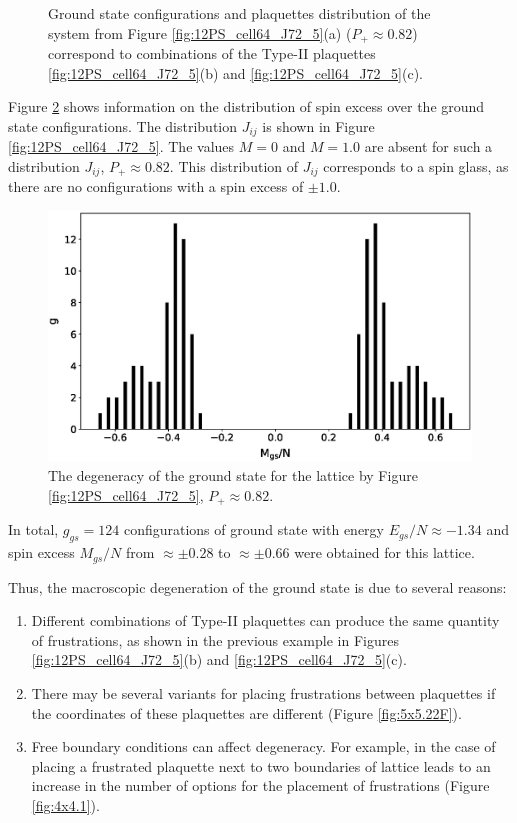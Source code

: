 \documentclass[preprint,12pt]{elsarticle}
\begin{document}
\begin{figure}[H]
\begin{minipage}[h]{0.3\linewidth}
		\end{minipage}
		\caption{Ground state configurations  and plaquettes distribution of the system from Figure \ref{fig:12PS_cell64_J72_5}(a) ($P_+\approx0.82$) correspond to combinations of the Type-II plaquettes \ref{fig:12PS_cell64_J72_5}(b) and \ref{fig:12PS_cell64_J72_5}(c).}
		\label{fig:12F_cell64_J72_5}
	\end{figure}
	
	Figure \ref{fig:g_Mgs} shows information on the distribution of spin excess over the ground state configurations. The distribution $J_{ij}$ is shown in Figure \ref{fig:12PS_cell64_J72_5}. The values $M=0$ and $M=1.0$ are absent for such a distribution $J_{ij}$, $P_+\approx0.82$. This distribution of $J_{ij}$ corresponds to a spin glass, as there are no configurations with a spin excess of $\pm1.0$.
	
	\begin{figure}[H]
		\centering
		\includegraphics[width=0.8\linewidth]{pictures/g_Mgs.eps}
		\caption{The degeneracy of the ground state for the lattice by Figure \ref{fig:12PS_cell64_J72_5}, $P_+\approx0.82$.}
		\label{fig:g_Mgs}
	\end{figure}
	
	In total, $g_{gs}=124$ configurations of ground state with energy $E_{gs}/N \approx -1.34$ and spin excess $M_{gs}/N$ from $\approx \pm 0.28$ to $\approx \pm 0.66$ were obtained for this lattice. 
	
	Thus, the macroscopic degeneration of the ground state is due to several reasons:
	
	\begin{enumerate}
		\item Different combinations of Type-II plaquettes can produce the same quantity of frustrations, as shown in the previous example in Figures \ref{fig:12PS_cell64_J72_5}(b) and \ref{fig:12PS_cell64_J72_5}(c).
		\item There may be several variants for placing frustrations between plaquettes if the coordinates of these plaquettes are different (Figure \ref{fig:5x5.22F}).
		\item Free boundary conditions can affect degeneracy. For example, in the case of placing a frustrated plaquette next to two boundaries of lattice leads to an increase in the number of options for the placement of frustrations (Figure \ref{fig:4x4.1}).
	\end{enumerate}
	
\end{document}
